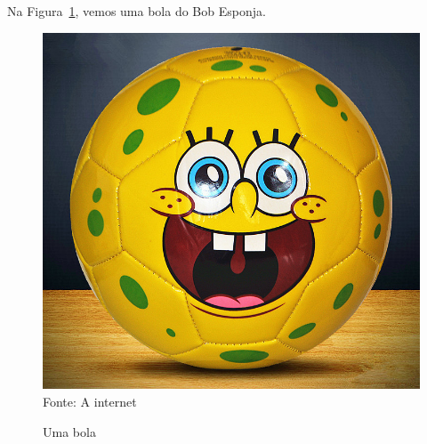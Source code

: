\documentclass{article}
\newcommand{\source}[1]{\\ Fonte: #1}
\begin{document}
Na Figura~\ref{fig:bolabobesponja}, vemos uma bola do Bob Esponja.

\begin{figure}[!h]
\centering
\caption{Uma bola}
\label{fig:bolabobesponja}
\includegraphics[scale=0.2]{ball.jpg}
\source{A internet}
\end{figure}
\end{document}
